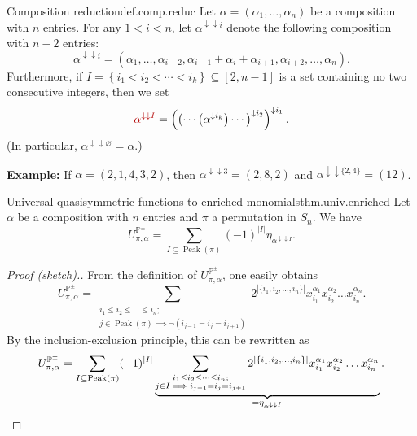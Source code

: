 \documentclass[numbers=enddot,12pt,final,onecolumn,notitlepage]{scrartcl}%
\newcommand{\al}{\alpha}
\newcommand{\PP}{\mathbb{P}} %
\newcommand{\Peak}{\operatorname{Peak}}
\newcommand{\set}[1]{\left\{ #1 \right\}}
\newcommand{\defnm}[1]{{\color{darkred} #1}}
\newcommand{\0}{\phantom{c}}
\let\sumnonlimits\sum
\renewcommand{\sum}{\sumnonlimits\limits}
\begin{document}
\begin{definition}{Composition reduction}{def.comp.reduc}
Let $\al = (\al_1, \dots, \al_n)$ be a composition with $n$ entries. For any $1 < i < n$, let $\al^{\downarrow\downarrow i}$ denote the following composition with $n-2$ entries:
\begin{equation*}
\al^{\downarrow\downarrow i} = (\al_1, \dots, \al_{i-2},{\al_{i-1}+\al_i+\al_{i+1}},\al_{i+2},\dots ,\al_n) .
\end{equation*}  
Furthermore, if $I = \set{i_1 < i_2 < \cdots < i_k} \subseteq [2, n-1]$ is a set containing no two consecutive integers, then we set
\[
\defnm{\al^{\downarrow\downarrow I}}
= \left( \left( \cdots \left( \al^{\downarrow i_k} \right) \cdots \right)^{\downarrow i_2} \right)^{\downarrow i_1} .
\]
(In particular, $\al^{\downarrow\downarrow \varnothing}= \al$.)
\end{definition}
\textbf{Example:} If $\al = (2,1,4,3,2)$, then $\al^{\downarrow\downarrow 3} = (2,8,2)$ and $\al^{\downarrow \downarrow\{2,4\}} = (12)$.
%
\begin{theorem}{Universal quasisymmetric functions to enriched monomials}{thm.univ.enriched}
Let $\alpha$ be a composition with $n$ entries and $\pi$ a permutation in $S_n$. We have
\begin{equation}
\label{eq : U as sum}
U^{\PP^\pm}_{\pi,\al} = \sum_{I \subseteq \Peak(\pi)}(-1)^{|I|}\eta_{\al^{\downarrow\downarrow I}} .
\end{equation}
\end{theorem}
\begin{proof}[Proof (sketch).]
From the definition of  $U^{\PP^\pm}_{\pi,\al}$, one easily obtains
\begin{equation*}
U^{\PP^\pm}_{\pi,\al} = \sum_{\substack{i_1\leq i_2\leq\dots \leq i_n;\\j\in \Peak(\pi) \implies \lnot \left( i_{j-1}=i_{j}=i_{j+1}\right)}}2^{|\{i_1,i_2,\dots,i_n\}|}x_{i_1}^{\al_1}x_{i_2}^{\al_2}\dots x_{i_n}^{\al_n} .
\end{equation*}
By the inclusion-exclusion principle, this can be rewritten as
\begin{equation*}
U^{\PP^\pm}_{\pi,\al} =\sum_{I \subseteq \Peak(\pi)}(-1)^{|I|} \underbrace{\sum_{\substack{i_1\leq i_2\leq\dots \leq i_n;\\j\in I \implies  i_{j-1}=i_{j}=i_{j+1}}}2^{|\{i_1,i_2,\dots,i_n\}|}x_{i_1}^{\al_1}x_{i_2}^{\al_2}\dots x_{i_n}^{\al_n}}_{\substack{= \eta_{\al^{\downarrow\downarrow I}}\\}} .
\qedhere
\end{equation*}
\end{proof}
\end{document}
